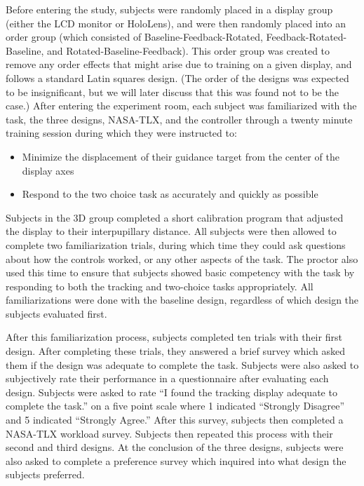 Before entering the study, subjects were randomly placed in a display group (either the LCD monitor or HoloLens), and were then randomly placed into an order group (which consisted of Baseline-Feedback-Rotated, Feedback-Rotated-Baseline, and Rotated-Baseline-Feedback).
This order group was created to remove any order effects that might arise due to training on a given display, and follows a standard Latin squares design.
(The order of the designs was expected to be insignificant, but we will later discuss that this was found not to be the case.)
After entering the experiment room, each subject was familiarized with the task, the three designs, NASA-TLX, and the controller through a twenty minute training session during which they were instructed to:
\begin{itemize}
    \item Minimize the displacement of their guidance target from the center of the display axes
    \item Respond to the two choice task as accurately and quickly as possible
\end{itemize}

Subjects in the 3D group completed a short calibration program that adjusted the display to their interpupillary distance.
All subjects were then allowed to complete two familiarization trials, during which time they could ask questions about how the controls worked, or any other aspects of the task.
The proctor also used this time to ensure that subjects showed basic competency with the task by responding to both the tracking and two-choice tasks appropriately.
All familiarizations were done with the baseline design, regardless of which design the subjects evaluated first.

After this familiarization process, subjects completed ten trials with their first design.
After completing these trials, they answered a brief survey which asked them if the design was adequate to complete the task.
Subjects were also asked to subjectively rate their performance in a questionnaire after evaluating each design.
Subjects were asked to rate ``I found the tracking display adequate to complete the task.'' on a five point scale where 1 indicated ``Strongly Disagree'' and 5 indicated ``Strongly Agree.''
After this survey, subjects then completed a NASA-TLX workload survey.
Subjects then repeated this process with their second and third designs.
At the conclusion of the three designs, subjects were also asked to complete a preference survey which inquired into what design the subjects preferred.

